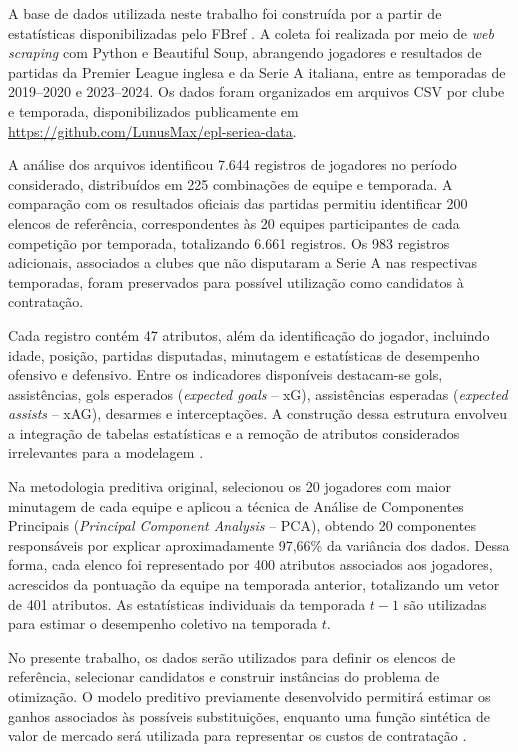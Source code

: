 \documentclass[12pt,a4paper]{article}
\begin{document}
A base de dados utilizada neste trabalho foi construída por \textcite{nunes2026} a partir de estatísticas disponibilizadas pelo FBref \parencite{fbref}. A coleta foi realizada por meio de \textit{web scraping} com Python e Beautiful Soup, abrangendo jogadores e resultados de partidas da Premier League inglesa e da Serie A italiana, entre as temporadas de 2019--2020 e 2023--2024. Os dados foram organizados em arquivos CSV por clube e temporada, disponibilizados publicamente em \url{https://github.com/LunusMax/epl-seriea-data}.

A análise dos arquivos identificou 7.644 registros de jogadores no período considerado, distribuídos em 225 combinações de equipe e temporada. A comparação com os resultados oficiais das partidas permitiu identificar 200 elencos de referência, correspondentes às 20 equipes participantes de cada competição por temporada, totalizando 6.661 registros. Os 983 registros adicionais, associados a clubes que não disputaram a Serie A nas respectivas temporadas, foram preservados para possível utilização como candidatos à contratação.

Cada registro contém 47 atributos, além da identificação do jogador, incluindo idade, posição, partidas disputadas, minutagem e estatísticas de desempenho ofensivo e defensivo. Entre os indicadores disponíveis destacam-se gols, assistências, gols esperados (\textit{expected goals} -- xG), assistências esperadas (\textit{expected assists} -- xAG), desarmes e interceptações. A construção dessa estrutura envolveu a integração de tabelas estatísticas e a remoção de atributos considerados irrelevantes para a modelagem \parencite{nunes2026}.

Na metodologia preditiva original, \textcite{nunes2026} selecionou os 20 jogadores com maior minutagem de cada equipe e aplicou a técnica de Análise de Componentes Principais (\textit{Principal Component Analysis} -- PCA), obtendo 20 componentes responsáveis por explicar aproximadamente 97,66\% da variância dos dados. Dessa forma, cada elenco foi representado por 400 atributos associados aos jogadores, acrescidos da pontuação da equipe na temporada anterior, totalizando um vetor de 401 atributos. As estatísticas individuais da temporada $t-1$ são utilizadas para estimar o desempenho coletivo na temporada $t$.

No presente trabalho, os dados serão utilizados para definir os elencos de referência, selecionar candidatos e construir instâncias do problema de otimização. O modelo preditivo previamente desenvolvido permitirá estimar os ganhos associados às possíveis substituições, enquanto uma função sintética de valor de mercado será utilizada para representar os custos de contratação \parencite{nunes2026}.
\end{document}
